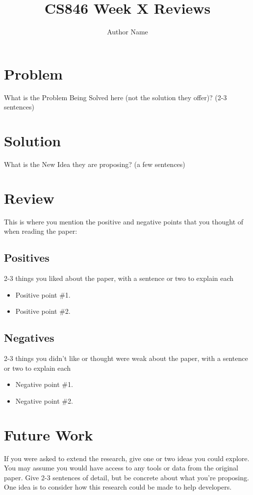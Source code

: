 \documentclass[sigconf, 10pt]{acmart}
\begin{document}
\title[Short Title]{CS846 Week X Reviews}
\author{Author Name}
\maketitle
\balance
\section{Problem}
What is the Problem Being Solved here (not the solution they offer)? (2-3 sentences)
\section{Solution}
What is the New Idea they are proposing?  (a few sentences)
\section{Review}
This is where you mention the positive and negative points that you thought of when reading the paper:
\subsection{Positives}
2-3 things you liked about the paper, with a sentence or two to explain each
\begin{itemize}
    \item Positive point \#1.
    \item Positive point \#2.
\end{itemize}

\subsection{Negatives}
2-3 things you didn't like or thought were weak about the paper, with a sentence or two to explain each
\begin{itemize}
    \item Negative point \#1.
    \item Negative point \#2.
\end{itemize}

\section{Future Work}
If you were asked to extend the research, give one or two ideas you could explore.  You may assume you would have access to any tools or data from the original paper.  Give 2-3 sentences of detail, but be concrete about what you're proposing.  One idea is to consider how this research could be made to help developers.
\end{document}
